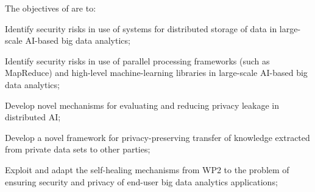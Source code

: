 \addtocounter{wpno}{1}
\begin{Workpackage}{\thewpno}
\WPTitle{\wpname{\thewpno}}

\begin{WPObjectives}
The objectives of \theWP{} are to:
\begin{compactitem}
\item Identify security risks in use of systems for distributed storage of data in large-scale AI-based big data analytics;
\item Identify security risks in use of parallel processing frameworks (such as MapReduce) and high-level machine-learning libraries in large-scale AI-based big data analytics;
\item Develop novel mechanisms for evaluating and reducing privacy leakage in distributed AI;
\item Develop a novel framework for privacy-preserving transfer of knowledge extracted from private data sets to other parties;
\item Exploit and adapt the self-healing mechanisms from WP2 to the problem of ensuring security and privacy of end-user big data analytics applications;
\end{compactitem}
\end{WPObjectives}


\end{Workpackage}
